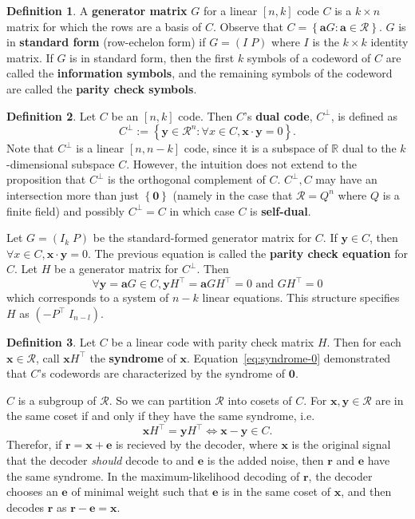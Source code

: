\documentclass{article}
\renewcommand{\tt}[1]{\text{ #1 }}
\newcommand{\R}{\mathbb{R}}
\newcommand{\calR}{\mathcal{R}}
\newcommand{\dual}[1]{#1^\bot}
\newcommand{\trans}[1]{#1^\top}
\renewcommand{\=}{\equiv}
\newcommand{\set}[1]{\left\{ #1 \right\}}
\renewcommand{\v}{\mathbf}
\newcommand{\x}{{\v x}}
\newcommand{\y}{{\v y}}
\theoremstyle{plain}
\theoremstyle{definition}
\newtheorem{defn}{Definition}[subsection]
\begin{document}
\begin{defn}
A \textbf{generator matrix} $G$ for a linear $[n,k]$ code $C$ is a $k \times n$ matrix for which the rows are a basis of $C$.
Observe that $C = \set{ \v a G : \v a \in \calR }$.
$G$ is in \textbf{standard form} (row-echelon form) if $G = (I \; P)$ where $I$ is the $k \times k$ identity matrix.
If $G$ is in standard form, then the first $k$ symbols of a codeword of $C$ are called the \textbf{information symbols}, and the remaining symbols of the codeword are called the \textbf{parity check symbols}.
\end{defn}

\begin{defn}
Let $C$ be an $[n, k]$ code. Then $C$'s \textbf{dual code}, $\dual C$, is defined as
$$ \dual C := \set{ \y \in \calR^n : \forall x \in C, \x \cdot \y = 0 }. $$
Note that $\dual C$ is a linear $[n, n-k]$ code, since it is a subspace of $\R$ dual to the $k$-dimensional subspace $C$. However, the intuition does not extend to the proposition that $\dual C$ is the orthogonal complement of $C$. $\dual C, C$ may have an intersection more than just $\set{\v 0}$ (namely in the case that $\calR = Q^n$ where $Q$ is a finite field) and possibly $\dual C = C$ in which case $C$ is \textbf{self-dual}.

Let $G = (I_k \; P)$ be the standard-formed generator matrix for $C$.
If $\y \in C$, then $\forall x \in C,\x \cdot \y = 0$. The previous equation is called the \textbf{parity check equation} for $C$.
Let $H$ be a generator matrix for $\dual C$.
Then
\begin{equation}
  \label{eq:syndrome-0}
  \forall \y = \v a G \in C, \y \trans H = \v a G \trans H = 0 \tt{and} G \trans H = 0
\end{equation}
which corresponds to a system of $n-k$ linear equations.
This structure specifies $H$ as $(-\trans P \; I_{n-l})$.
\end{defn}

\begin{defn}
Let $C$ be a linear code with parity check matrix $H$.
Then for each $\v x \in \calR$, call $\x \trans H$ the \textbf{syndrome} of $\x$.
Equation~\ref{eq:syndrome-0} demonstrated that $C$'s codewords are characterized by the syndrome of $\v 0$.

$C$ is a subgroup of $\calR$.
So we can partition $\calR$ into cosets of $C$.
For $\x, \y \in \calR$ are in the same coset if and only if they have the same syndrome, i.e.
$$ \x \trans H = \y \trans H \iff \x - \y \in C. $$
Therefor, if $\v r = \x + \v e$ is recieved by the decoder, where $\x$ is the original signal that the decoder \textit{should} decode to and $\v e$ is the added noise, then $\v r$ and $\v e$ have the same syndrome.
In the maximum-likelihood decoding of $\v r$, the decoder chooses an $\v e$ of minimal weight such that $\v e$ is in the same coset of $\x$, and then decodes $\v r$ as $\v r - \v e = \v x$.
\end{defn}
\end{document}
